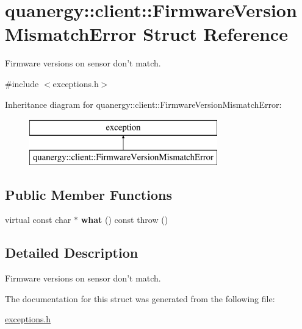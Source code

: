 \hypertarget{structquanergy_1_1client_1_1FirmwareVersionMismatchError}{\section{quanergy\-:\-:client\-:\-:Firmware\-Version\-Mismatch\-Error Struct Reference}
\label{structquanergy_1_1client_1_1FirmwareVersionMismatchError}
}


Firmware versions on sensor don't match.  




{\ttfamily \#include $<$exceptions.\-h$>$}

Inheritance diagram for quanergy\-:\-:client\-:\-:Firmware\-Version\-Mismatch\-Error\-:\begin{figure}[H]
\begin{center}
\leavevmode
\includegraphics[height=2.000000cm]{structquanergy_1_1client_1_1FirmwareVersionMismatchError}
\end{center}
\end{figure}
\subsection*{Public Member Functions}
\begin{DoxyCompactItemize}
\item 
\hypertarget{structquanergy_1_1client_1_1FirmwareVersionMismatchError_a521b7c22b272973a0f51de6e98e9951d}{virtual const char $\ast$ {\bfseries what} () const   throw ()}\label{structquanergy_1_1client_1_1FirmwareVersionMismatchError_a521b7c22b272973a0f51de6e98e9951d}

\end{DoxyCompactItemize}


\subsection{Detailed Description}
Firmware versions on sensor don't match. 

The documentation for this struct was generated from the following file\-:\begin{DoxyCompactItemize}
\item 
\hyperlink{exceptions_8h}{exceptions.\-h}\end{DoxyCompactItemize}
